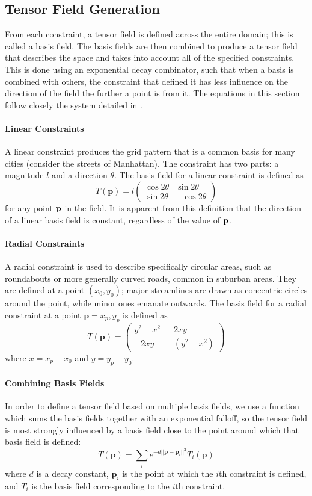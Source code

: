 \documentclass[twocolumn]{article}
\newcommand{\sqmat}[4]{\ensuremath{
    \left(\begin{array}{cc}
        #1 & #2 \\
        #3 & #4
    \end{array}\right)}}
\newcommand{\pt}{\textbf{p}}
\begin{document}
\subsection{Tensor Field Generation}
From each constraint, a tensor field is defined across the entire domain; this
is called a basis field. The basis fields are then combined to produce a tensor
field that describes the space and takes into account all of the specified
constraints. This is done using an exponential decay combinator, such that when
a basis is combined with others, the constraint that defined it has less
influence on the direction of the field the further a point is from it. The
equations in this section follow closely the system detailed in \cite{chen}.

\paragraph{Linear Constraints}
A linear constraint produces the grid pattern that is a common basis for many
cities (consider the streets of Manhattan). The constraint has two parts: a
magnitude $l$ and a direction $\theta$. The basis field for a linear constraint
is defined as
\[
    T(\pt) =
        l\sqmat{\cos{2\theta}}{\sin{2\theta}}{\sin{2\theta}}{-\cos{2\theta}}
\]
for any point $\bf p$ in the field. It is apparent from this definition that
the direction of a linear basis field is constant, regardless of the value of
$\bf p$.

\paragraph{Radial Constraints}
A radial constraint is used to describe specifically circular areas, such as
roundabouts or more generally curved roads, common in suburban areas. They are
defined at a point $(x_0,y_0)$; major streamlines are drawn as concentric
circles
around the point, while minor ones emanate outwards. The basis field for a
radial constraint at a point $\pt=x_p,y_p$ is defined as
\[
    T(\pt) = \sqmat{y^2-x^2}{-2xy}{-2xy}{-(y^2-x^2)}
\]
where $x=x_p-x_0$ and $y=y_p-y_0$.

\paragraph{Combining Basis Fields}
In order to define a tensor field based on multiple basis fields, we use a
function which sums the basis fields together with an exponential falloff,
so the tensor field is most strongly influenced by a basis field close to
the point around which that basis field is defined:
\[
    T(\pt) = \sum_i e^{-d||\pt-\pt_i||^2}T_i(\pt)
\]
where $d$ is a decay constant, $\pt_i$ is the point at which the $i$th
constraint is defined, and $T_i$ is the basis field corresponding to the $i$th
constraint.
\end{document}
